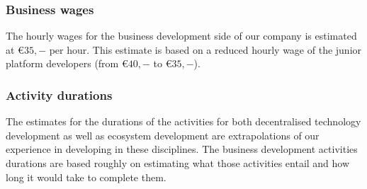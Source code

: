 \subsubsection{Business wages}
The hourly wages for the business development side of our company is estimated at \euro$35,-$ per hour. This estimate is based on a reduced hourly wage of the junior platform developers (from \euro$40,-$ to \euro$35,-$).

\subsubsection{Activity durations}
The estimates for the durations of the activities for both decentralised technology development as well as ecosystem development are extrapolations of our experience in developing in these disciplines. The business development activities durations are based roughly on estimating what those activities entail and how long it would take to complete them.
